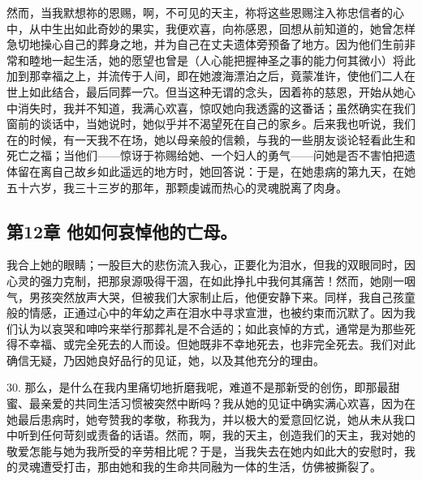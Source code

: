 然而，当我默想祢的恩赐，啊，不可见的天主，祢将这些恩赐注入祢忠信者的心中，从中生出如此奇妙的果实，我便欢喜，向祢感恩，回想从前知道的，她曾怎样急切地操心自己的葬身之地，并为自己在丈夫遗体旁预备了地方。因为他们生前非常和睦地一起生活，她的愿望也曾是（人心能把握神圣之事的能力何其微小）将此加到那幸福之上，并流传于人间，即在她渡海漂泊之后，竟蒙准许，使他们二人在世上如此结合，最后同葬一穴。但当这种无谓的念头，因着祢的慈恩，开始从她心中消失时，我并不知道，我满心欢喜，惊叹她向我透露的这番话；虽然确实在我们窗前的谈话中，当她说时，她似乎并不渴望死在自己的家乡。后来我也听说，我们在的时候，有一天我不在场，她以母亲般的信赖，与我的一些朋友谈论轻看此生和死亡之福；当他们——惊讶于祢赐给她、一个妇人的勇气——问她是否不害怕把遗体留在离自己故乡如此遥远的地方时，她回答说：于是，在她患病的第九天，在她五十六岁，我三十三岁的那年，那颗虔诚而热心的灵魂脱离了肉身。\par


\subsection{第12章 他如何哀悼他的亡母。}

我合上她的眼睛；一股巨大的悲伤流入我心，正要化为泪水，但我的双眼同时，因心灵的强力克制，把那泉源吸得干涸，在如此挣扎中我何其痛苦！然而，她刚一咽气，男孩突然放声大哭，但被我们大家制止后，他便安静下来。同样，我自己孩童般的情感，正通过心中的年幼之声在泪水中寻求宣泄，也被约束而沉默了。因为我们认为以哀哭和呻吟来举行那葬礼是不合适的；如此哀悼的方式，通常是为那些死得不幸福、或完全死去的人而设。但她既非不幸地死去，也非完全死去。我们对此确信无疑，乃因她良好品行的见证，她，以及其他充分的理由。\par

30. 那么，是什么在我内里痛切地折磨我呢，难道不是那新受的创伤，即那最甜蜜、最亲爱的共同生活习惯被突然中断吗？我从她的见证中确实满心欢喜，因为在她最后患病时，她夸赞我的孝敬，称我为，并以极大的爱意回忆说，她从未从我口中听到任何苛刻或责备的话语。然而，啊，我的天主，创造我们的天主，我对她的敬爱怎能与她为我所受的辛劳相比呢？于是，当我失去在她内如此大的安慰时，我的灵魂遭受打击，那由她和我的生命共同融为一体的生活，仿佛被撕裂了。\par

